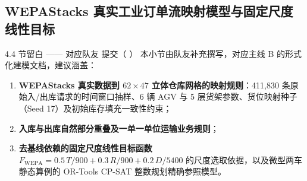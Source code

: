 \subsection{WEPAStacks 真实工业订单流映射模型与固定尺度线性目标}

\begin{teammatebox}{4.4 节留白 —— 对应队友  提交（ ）}
  本小节由队友补充撰写，对应主线 B 的形式化建模文档，建议涵盖：
  \begin{enumerate}
    \item \textbf{WEPAStacks 真实数据到 $62\times 47$ 立体仓库网格的映射规则}：411,830 条原始入/出库请求的时间窗口抽样、6 辆 AGV 与 5 层货架参数、货位映射种子（Seed 17）及初始库存填充一致性约束；
    \item \textbf{入库与出库自然部分重叠及一单一单位运输业务规则}；
    \item \textbf{去基线依赖的固定尺度线性目标函数 $F_{\text{WEPA}} = 0.5\,T/900 + 0.3\,R/900 + 0.2\,D/5400$} 的尺度选取依据，以及微型两车静态算例的 OR-Tools CP-SAT 整数规划精确参照模型。
  \end{enumerate}
\end{teammatebox}
